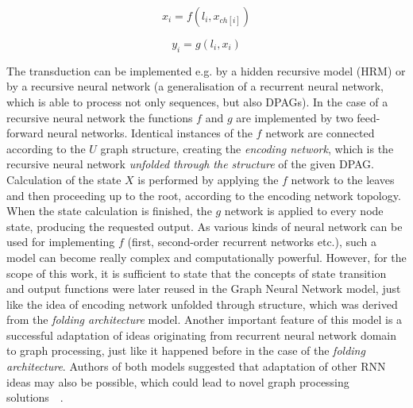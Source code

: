 \begin{equation}
x_i = f(l_i, x_{ch[i]})
\label{eq:recursive_state}
\end{equation}

\begin{equation}
	y_i = g(l_i, x_i)
\label{eq:recursive_output}
\end{equation}

The transduction can be implemented e.g. by a hidden recursive model (HRM) or by a recursive neural network (a generalisation of a recurrent neural network, which is able to process not only sequences, but also DPAGs). In the case of a recursive neural network the functions $f$ and $g$ are implemented by two feed-forward neural networks. Identical instances of the $f$ network are connected according to the $U$ graph structure, creating the \emph{encoding network}, which is the recursive neural network \emph{unfolded through the structure} of the given DPAG. Calculation of the state $X$ is performed by applying the $f$ network to the leaves and then proceeding up to the root, according to the encoding network topology. When the state calculation is finished, the $g$ network is applied to every node state, producing the requested output. As various kinds of neural network can be used for implementing $f$ (first, second-order recurrent networks etc.), such a model can become really complex and computationally powerful. However, for the scope of this work, it is sufficient to state that the concepts of state transition and output functions were later reused in the Graph Neural Network model, just like the idea of encoding network unfolded through structure, which was derived from the \emph{folding architecture} model. Another important feature of this model is a successful adaptation of ideas originating from recurrent neural network domain to graph processing, just like it happened before in the case of the \emph{folding architecture}. Authors of both models suggested that adaptation of other RNN ideas may also be possible, which could lead to novel graph processing solutions~\cite{kuchler1996inductive}~\cite{frasconi1998general}.
